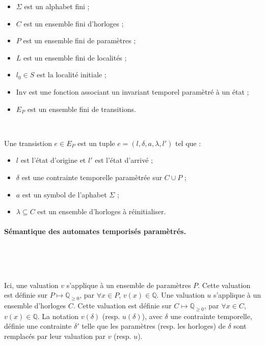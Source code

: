 \documentclass{article}
\begin{document}
        \begin{itemize}
          \item $\Sigma$ est un alphabet fini ;
          \item $C$ est un ensemble fini d'horloges ;
          \item $P$ est un ensemble fini de paramètres ;
          \item $L$ est un ensemble fini de localités ;
          \item $l_0 \in S$ est la localité initiale ;
          \item $\mathrm{Inv}$ est une fonction associant un invariant temporel
            paramètré à un état ;
          \item $E_P$ est un ensemble fini de transitions.
        \end{itemize}

        ~

        \noindent
        Une transistion $e \in E_P$ est un tuple $e = (l,\delta,a,\lambda,l')$
        tel que :
    
        \begin{itemize}
          \item $l$ est l'état d'origine et $l'$ est l'état d'arrivé ;
          \item $\delta$ est une contrainte temporelle paramètrée sur $C \cup P$
            ;
          \item $a$ est un symbol de l'aphabet $\Sigma$ ;
          \item $\lambda \subseteq C$ est un ensemble d'horloges à
            réinitialiser.
        \end{itemize}
        
      \paragraph{Sémantique des automates temporisés paramètrés.} ~
      
        ~
        
        Ici, une valuation $v$ s'applique à un ensemble de paramètres $P$. Cette
        valuation est définie sur $P \mapsto \mathbb{Q}_{\geq 0}$, par $\forall
        x \in P$, $v(x) \in \mathbb{Q}$. Une valuation $u$ s'applique à un
        ensemble d'horloges $C$. Cette valuation est définie sur $C \mapsto
        \mathbb{Q}_{\geq 0}$, par $\forall x \in C$, $v(x) \in \mathbb{Q}$. La
        notation $v(\delta)$ (resp. $u(\delta)$), avec $\delta$ une contrainte
        temporelle, définie une contrainte $\delta'$ telle que les paramètres
        (resp. les horloges) de $\delta$ sont remplacés par leur valuation
        par $v$ (resp. $u$).
\end{document}

